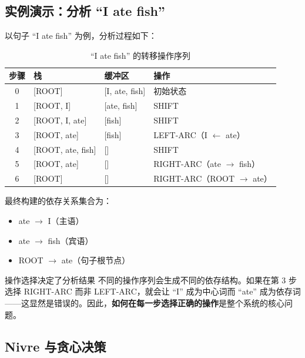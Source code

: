\documentclass[a4paper]{article}
\begin{document}
\subsection{实例演示：分析 ``I ate fish''}





以句子 ``I ate fish'' 为例，分析过程如下：

\begin{table}[H]
\centering
\small
\begin{tabular}{clll}
\toprule
\textbf{步骤} & \textbf{栈} & \textbf{缓冲区} & \textbf{操作} \\
\midrule
0 & [ROOT] & [I, ate, fish] & 初始状态 \\
1 & [ROOT, I] & [ate, fish] & SHIFT \\
2 & [ROOT, I, ate] & [fish] & SHIFT \\
3 & [ROOT, ate] & [fish] & LEFT-ARC（I $\leftarrow$ ate） \\
4 & [ROOT, ate, fish] & [] & SHIFT \\
5 & [ROOT, ate] & [] & RIGHT-ARC（ate $\rightarrow$ fish） \\
6 & [ROOT] & [] & RIGHT-ARC（ROOT $\rightarrow$ ate） \\
\bottomrule
\end{tabular}
\caption{``I ate fish'' 的转移操作序列}
\end{table}





最终构建的依存关系集合为：
\begin{itemize}
    \item ate $\rightarrow$ I（主语）
    \item ate $\rightarrow$ fish（宾语）
    \item ROOT $\rightarrow$ ate（句子根节点）
\end{itemize}

\begin{warningbox}{操作选择决定了分析结果}
不同的操作序列会生成不同的依存结构。如果在第 3 步选择 RIGHT-ARC 而非 LEFT-ARC，就会让 ``I'' 成为中心词而 ``ate'' 成为依存词——这显然是错误的。因此，\textbf{如何在每一步选择正确的操作}是整个系统的核心问题。
\end{warningbox}

\subsection{Nivre 与贪心决策}
\end{document}
